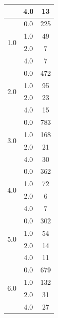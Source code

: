 \begin{longtable}{|c|c|c|c|c|}
& \multicolumn{2}{c|}{4.0} & \multicolumn{2}{c|}{13} \\
\hline
\multirow{4}{*}{1.0} & \multicolumn{2}{c|}{0.0} & \multicolumn{2}{c|}{225} \\
& \multicolumn{2}{c|}{1.0} & \multicolumn{2}{c|}{49} \\
& \multicolumn{2}{c|}{2.0} & \multicolumn{2}{c|}{7} \\
& \multicolumn{2}{c|}{4.0} & \multicolumn{2}{c|}{7} \\
\hline
\multirow{4}{*}{2.0} & \multicolumn{2}{c|}{0.0} & \multicolumn{2}{c|}{472} \\
& \multicolumn{2}{c|}{1.0} & \multicolumn{2}{c|}{95} \\
& \multicolumn{2}{c|}{2.0} & \multicolumn{2}{c|}{23} \\
& \multicolumn{2}{c|}{4.0} & \multicolumn{2}{c|}{15} \\
\hline
\multirow{4}{*}{3.0} & \multicolumn{2}{c|}{0.0} & \multicolumn{2}{c|}{783} \\
& \multicolumn{2}{c|}{1.0} & \multicolumn{2}{c|}{168} \\
& \multicolumn{2}{c|}{2.0} & \multicolumn{2}{c|}{21} \\
& \multicolumn{2}{c|}{4.0} & \multicolumn{2}{c|}{30} \\
\hline
\multirow{4}{*}{4.0} & \multicolumn{2}{c|}{0.0} & \multicolumn{2}{c|}{362} \\
& \multicolumn{2}{c|}{1.0} & \multicolumn{2}{c|}{72} \\
& \multicolumn{2}{c|}{2.0} & \multicolumn{2}{c|}{6} \\
& \multicolumn{2}{c|}{4.0} & \multicolumn{2}{c|}{7} \\
\hline
\multirow{4}{*}{5.0} & \multicolumn{2}{c|}{0.0} & \multicolumn{2}{c|}{302} \\
& \multicolumn{2}{c|}{1.0} & \multicolumn{2}{c|}{54} \\
& \multicolumn{2}{c|}{2.0} & \multicolumn{2}{c|}{14} \\
& \multicolumn{2}{c|}{4.0} & \multicolumn{2}{c|}{11} \\
\hline
\multirow{4}{*}{6.0} & \multicolumn{2}{c|}{0.0} & \multicolumn{2}{c|}{679} \\
& \multicolumn{2}{c|}{1.0} & \multicolumn{2}{c|}{132} \\
& \multicolumn{2}{c|}{2.0} & \multicolumn{2}{c|}{31} \\
& \multicolumn{2}{c|}{4.0} & \multicolumn{2}{c|}{27} \\
\hline

\end{longtable}
